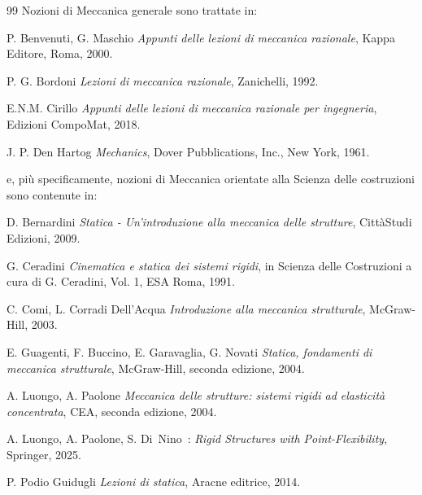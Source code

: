 \begin{thebibliography}{99}
\vspace{0.5 cm} \noindent Nozioni di Meccanica  generale sono
trattate in:


P. Benvenuti, G. Maschio \emph{Appunti delle lezioni di meccanica
razionale}, Kappa Editore, Roma, 2000.


P. G. Bordoni \emph{Lezioni di meccanica razionale}, Zanichelli,
1992.

 E.N.M. Cirillo  \emph{Appunti delle lezioni di meccanica
razionale per ingegneria}, Edizioni CompoMat, 2018.

J. P. Den Hartog \emph{Mechanics}, Dover Pubblications, Inc., New
York, 1961.






\vspace{0.5 cm} \noindent e, pi\`{u} specificamente, nozioni di
Meccanica orientate alla Scienza delle costruzioni sono contenute
in:

 D. Bernardini \emph{Statica - Un'introduzione alla meccanica delle strutture}, CittàStudi Edizioni, 2009. 

G. Ceradini {\em Cinematica e statica dei sistemi rigidi}, in Scienza
delle Costruzioni a cura di G. Ceradini, Vol. 1, ESA Roma, 1991.


C. Comi, L. Corradi Dell'Acqua {\em Introduzione alla meccanica
strutturale}, McGraw-Hill, 2003.

E. Guagenti, F. Buccino, E. Garavaglia, G. Novati \emph{Statica,
fondamenti di meccanica strutturale}, McGraw-Hill, seconda edizione,
2004.


A. Luongo, A. Paolone {\em Meccanica delle strutture: sistemi
rigidi ad elasticit\`{a} concentrata}, CEA, seconda edizione,
2004.

A. Luongo, A. Paolone, S. Di~Nino~: \textit{Rigid Structures with Point-Flexibility}, Springer, 2025.


P. Podio Guidugli {\em Lezioni di statica}, Aracne editrice, 2014.



\end{thebibliography}
